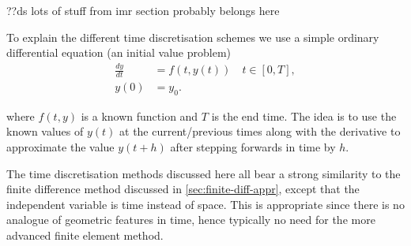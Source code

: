 ??ds lots of stuff from imr section probably belongs here

To explain the different time discretisation schemes we use a simple ordinary differential equation (an initial value problem)
\begin{equation}
  \begin{aligned}
    \frac{dy}{dt} &= f(t,y(t)) \quad t \in [0,T], \\
    y(0) &= y_0.
    \label{eq:45}
  \end{aligned}
\end{equation}

where $f(t,y)$ is a known function and $T$ is the end time. The idea is to use the known values of $y(t)$ at the current/previous times along with the derivative to approximate the value $y(t+h)$  after stepping forwards in time by $h$.

The time discretisation methods discussed here all bear a strong similarity to the finite difference method discussed in \autoref{sec:finite-diff-appr}, except that the independent variable is time instead of space.
This is appropriate since there is no analogue of geometric features in time, hence typically no need for the more advanced finite element method.

